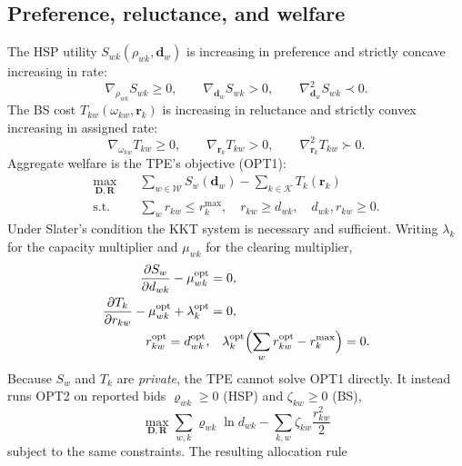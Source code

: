 \documentclass[journal,a4paper,10pt]{IEEEtran}
\begin{document}
\subsection{Preference, reluctance, and welfare}
The HSP utility \(S_{wk}(\rho_{wk},\mathbf{d}_w)\) is increasing in preference and strictly concave increasing in rate:
\begin{equation}
  \nabla_{\rho_{wk}} S_{wk}\ge 0,\qquad
  \nabla_{\mathbf{d}_w} S_{wk}>0,\qquad
  \nabla^2_{\mathbf{d}_w} S_{wk}\prec 0.
  \label{eq:hsp-shape}
\end{equation}
The BS cost \(T_{kw}(\omega_{kw},\mathbf{r}_k)\) is increasing in reluctance and strictly convex increasing in assigned rate:
\begin{equation}
  \nabla_{\omega_{kw}} T_{kw}\ge 0,\qquad
  \nabla_{\mathbf{r}_k} T_{kw}>0,\qquad
  \nabla^2_{\mathbf{r}_k} T_{kw}\succ 0.
  \label{eq:bs-shape}
\end{equation}
Aggregate welfare is the TPE's objective (OPT1):
\begin{align}
  \max_{\mathbf{D},\mathbf{R}}
  &\quad \sum_{w\in\mathcal{W}} S_w(\mathbf{d}_w)
     - \sum_{k\in\mathcal{K}} T_k(\mathbf{r}_k)
     \label{eq:opt1}\\
  \text{s.t.}
  &\quad \sum_{w} r_{kw}\le r_k^{\max},\quad
        r_{kw}\ge d_{wk},\quad
        d_{wk},r_{kw}\ge 0.
        \nonumber
\end{align}
Under Slater's condition the KKT system is necessary and sufficient. Writing \(\lambda_k\) for the capacity multiplier and \(\mu_{wk}\) for the clearing multiplier,
\begin{align}
  \frac{\partial S_w}{\partial d_{wk}}-\mu_{wk}^{\mathrm{opt}}&=0,
  \label{eq:kkt-hsp}\\
  \frac{\partial T_k}{\partial r_{kw}}-\mu_{wk}^{\mathrm{opt}}+\lambda_k^{\mathrm{opt}}&=0,
  \label{eq:kkt-bs}\\
  r_{kw}^{\mathrm{opt}}=d_{wk}^{\mathrm{opt}},&\quad
  \lambda_k^{\mathrm{opt}}\Bigl(\sum_w r_{kw}^{\mathrm{opt}}-r_k^{\max}\Bigr)=0.
  \nonumber
\end{align}
Because \(S_w\) and \(T_k\) are \emph{private}, the TPE cannot solve OPT1 directly. It instead runs OPT2 on reported bids \(\varrho_{wk}\ge 0\) (HSP) and \(\zeta_{kw}\ge 0\) (BS),
\begin{equation}
  \max_{\mathbf{D},\mathbf{R}}
  \sum_{w,k}\varrho_{wk}\ln d_{wk}
  -\sum_{k,w}\zeta_{kw}\frac{r_{kw}^2}{2}
  \label{eq:opt2}
\end{equation}
subject to the same constraints. The resulting allocation rule
\end{document}
